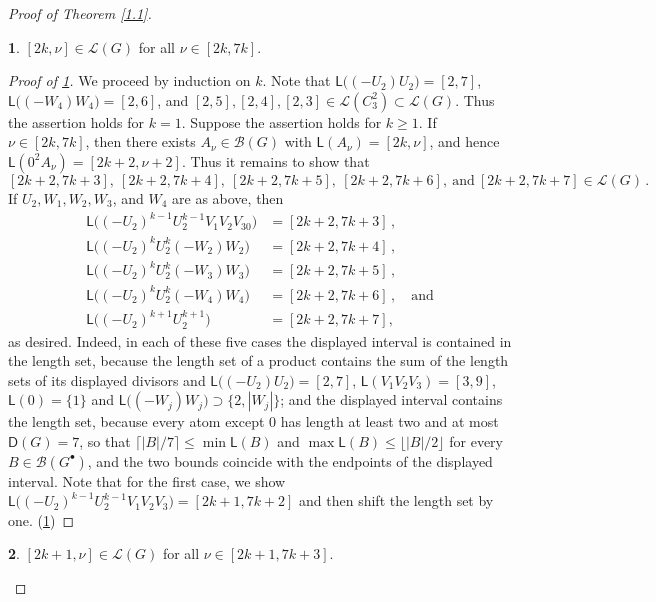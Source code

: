 \documentclass[a4paper, 10pt]{amsart}
\theoremstyle{plain}
\theoremstyle{definition}
\theoremstyle{definition}
\newtheorem{claim}{}[theorem]
\numberwithin{equation}{section}
\begin{document}
\begin{proof}[Proof of Theorem \ref{1.1}]
\begin{claim}\label{k5-A1}
	$[2k, \nu] \in \mathcal L (G)$ for all $\nu \in [2k, 7k]$.
\end{claim}


\begin{proof}[Proof of \ref{k5-A1}] We proceed by induction on $k$.
	Note that $\mathsf L \big((-U_2)U_2 \big)=[2,7]$, \ $\mathsf L \big( (-W_4)W_4 \big)=[2,6]$,
	and $[2,5], [2,4], [2,3]\in \mathcal L(C_3^2)\subset \mathcal L(G)$.
	Thus the assertion holds for $k=1$.
	Suppose the assertion holds for $k \ge 1$. If $\nu \in [2k, 7k]$, then there exists $A_{\nu} \in \mathcal B (G)$ with $\mathsf L (A_{\nu}) = [2k, \nu]$, and hence $\mathsf L (0^2 A_{\nu}) = [2k+2, \nu+2]$. Thus it remains to show that
	\[
	[2k+2, 7k+3], \ [2k+2, 7k+4], \ [2k+2, 7k+5], \ [2k+2, 7k+6], \ \text{and} \ [2k+2, 7k+7] \in \mathcal L (G)\,.
	\]
	If $U_2, W_1, W_2, W_3$, and $W_4$ are as above, then
	\begin{align*}
	\mathsf L \big( (-U_2)^{k-1}U_2^{k-1}V_1V_2V_30 \big) & = [2k+2, 7k+3]\,, \\
	\mathsf L \big( (-U_2)^k U_2^k (-W_2) W_2 \big) & = [2k+2, 7k+4] \,,\\
	\mathsf L \big( (-U_2)^k U_2^k (-W_3)W_3 \big) & = [2k+2, 7k+5] \,, \\
	\mathsf L \big( (-U_2)^k U_2^k (-W_4) W_4 \big) & = [2k+2, 7k+6] \,, \quad \text{and} \\
	\mathsf L \big( (-U_2)^{k+1} U_2^{k+1} \big) & = [2k+2, 7k+7] ,	\end{align*}
	as desired.  Indeed, in each of these five cases the displayed interval is
	contained in the length set, because the length set of a product contains
	the sum of the length sets of its displayed divisors and
	$\mathsf L \big((-U_2)U_2\big) = [2,7]$, $\mathsf L (V_1V_2V_3) = [3,9]$,
	$\mathsf L (0) = \{1\}$ and $\mathsf L \big((-W_j)W_j\big) \supset
	\{2, |W_j|\}$; and the displayed interval contains the length set, because every atom except  $0$ has length at
	least two  and at most $\mathsf D (G) = 7$, so that
	$\lceil |B|/7 \rceil \le \min \mathsf L (B)$ and
	$\max \mathsf L (B) \le \lfloor |B|/2 \rfloor$ for every
	$B \in \mathcal B (G^{\bullet})$, and the two bounds coincide with the
	endpoints of the displayed interval. Note that for the first case, we show $\mathsf L \big( (-U_2)^{k-1}U_2^{k-1}V_1V_2V_3 \big)  = [2k+1, 7k+2]$ and then shift the length set by one. \qedhere (\ref{k5-A1})
\end{proof}


\begin{claim}\label{k5-A2} $[2k+1, \nu] \in \mathcal L (G)$ for all $\nu \in [2k+1, 7k+3]$.
\end{claim}



\end{proof}
\end{document}
